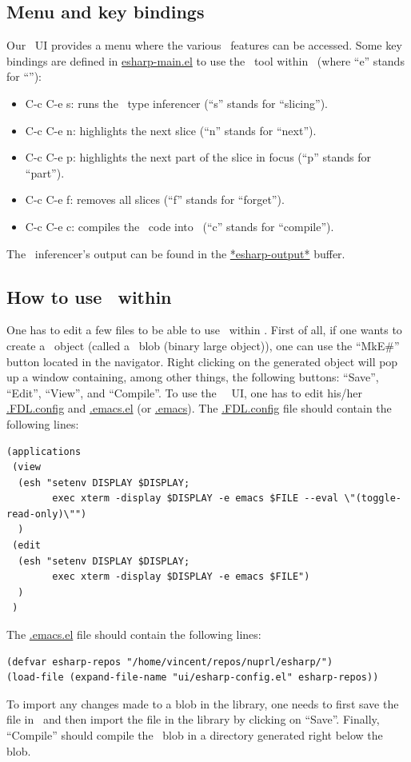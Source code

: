 \documentclass[final]{article}
\begin{document}
\subsection{Menu and key bindings}

Our \emacs~UI provides a menu where the various \eml\ features can be
accessed.
Some key bindings are defined in \url{esharp-main.el} to use the
\eml\ tool within \emacs\ (where ``e'' stands for ``\eml''):
\begin{itemize}
\item C-c C-e s: runs the \eml\ type inferencer (``s'' stands for ``slicing'').
\item C-c C-e n: highlights the next slice (``n'' stands for ``next'').
\item C-c C-e p: highlights the next part of the slice in focus (``p'' stands for ``part'').
\item C-c C-e f: removes all slices (``f'' stands for ``forget'').
\item C-c C-e c: compiles the \eml\ code into \nuprl\ (``c'' stands for ``compile'').
\end{itemize}

The \eml\ inferencer's output can be found in the
\url{*esharp-output*} buffer.


\subsection{How to use \eml\ within \nuprl}
%
One has to edit a few files to be able to use \eml\ within \nuprl.
%
First of all, if one wants to create a \eml\ object (called a
\eml\ blob (binary large object)), one can use the ``MkE\#'' button
located in the navigator.
Right clicking on the generated object will
pop up a window containing, among other things, the following buttons:
``Save'', ``Edit'', ``View'', and ``Compile''.
To use the \eml\ \emacs~UI, one has to edit his/her
\url{.FDL.config} and \url{.emacs.el} (or \url{.emacs}).
The \url{.FDL.config} file should contain the following lines:
\begin{center}
\begin{footnotesize}
\begin{verbatim}
(applications
 (view
  (esh "setenv DISPLAY $DISPLAY;
        exec xterm -display $DISPLAY -e emacs $FILE --eval \"(toggle-read-only)\"")
  )
 (edit
  (esh "setenv DISPLAY $DISPLAY;
        exec xterm -display $DISPLAY -e emacs $FILE")
  )
 )
\end{verbatim}
\end{footnotesize}
\end{center}
The \url{.emacs.el} file should contain the following lines:
\begin{center}
\begin{verbatim}
(defvar esharp-repos "/home/vincent/repos/nuprl/esharp/")
(load-file (expand-file-name "ui/esharp-config.el" esharp-repos))
\end{verbatim}
\end{center}
To import any changes made to a blob in the library, one needs to
first save the file in \emacs\ and then import the file in the library
by clicking on ``Save''.  Finally, ``Compile'' should compile the
\eml\ blob in a directory generated right below the blob.
\end{document}
